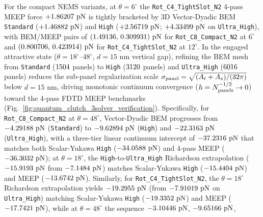 \documentclass[11pt,letterpaper]{article}
\begin{document}
For the compact NEMS variants, at $\theta=6^\circ$ the \texttt{Rot\_C4\_TightSlot\_N2} 4-pass MEEP force $+1.86207{}\text{ pN}$ is tightly bracketed by 3D Vector-Dyadic BEM \texttt{Standard} ($+1.46882{}\text{ pN}$) and \texttt{High} ($+2.56719{}\text{ pN}$; $+4.33499{}\text{ pN}$ on \texttt{Ultra\_High}), with BEM/MEEP pairs of $(1.49136{},\,0.309931{})\text{ pN}$ for \texttt{Rot\_C8\_Compact\_N2} at $6^\circ$ and $(0.800706{},\,0.423914{})\text{ pN}$ for \texttt{Rot\_C4\_TightSlot\_N2} at $12^\circ$. In the engaged attractive state ($\theta=18^\circ\text{--}48^\circ$, $d=15\text{ nm}$ vertical gap), refining the BEM mesh from \texttt{Standard} ($1504{}$ panels) to \texttt{High} ($3120{}$ panels) and \texttt{Ultra\_High} ($6016{}$ panels) reduces the sub-panel regularization scale $\sigma_{\rm panel} = \sqrt{(A_t+A_s)/(32\pi)}$ below $d=15\text{ nm}$, driving monotonic continuum convergence ($h = N_{\rm panels}^{-1/2} \to 0$) toward the 4-pass FDTD MEEP benchmarks (Fig.~\ref{fig:quantum_clutch_3solver_verification}). Specifically, for \texttt{Rot\_C8\_Compact\_N2} at $\theta=48^\circ$, Vector-Dyadic BEM progresses from $-4.29188{}\text{ pN}$ (\texttt{Standard}) to $-9.62894{}\text{ pN}$ (\texttt{High}) and $-22.3163{}\text{ pN}$ (\texttt{Ultra\_High}), with a three-tier linear continuum intercept of $-37.2316{}\text{ pN}$ that matches both Scalar-Yukawa \texttt{High} ($-34.0588{}\text{ pN}$) and 4-pass MEEP ($-36.3032{}\text{ pN}$); at $\theta=18^\circ$, the \texttt{High}-to-\texttt{Ultra\_High} Richardson extrapolation ($-15.9193{}\text{ pN}$ from $-7.1484{}\text{ pN}$) matches Scalar-Yukawa \texttt{High} ($-15.4404{}\text{ pN}$) and MEEP ($-13.6742{}\text{ pN}$). Similarly, for \texttt{Rot\_C4\_TightSlot\_N2}, the $\theta=18^\circ$ Richardson extrapolation yields $-19.2955{}\text{ pN}$ (from $-7.91019{}\text{ pN}$ on \texttt{Ultra\_High}) matching Scalar-Yukawa \texttt{High} ($-19.3352{}\text{ pN}$) and MEEP ($-17.7421{}\text{ pN}$), while at $\theta=48^\circ$ the sequence $-3.10446{}\text{ pN}$, $-9.65166{}\text{ pN}$, 
\end{document}
